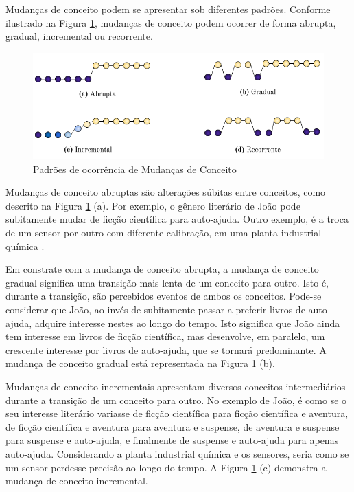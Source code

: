 \documentclass[qual, classic, a4paper]{ufbathesis}
\begin{document}
Mudanças de conceito podem se apresentar sob diferentes padrões.
Conforme ilustrado na Figura \ref{fig:concept_drift_patterns}, mudanças de conceito podem ocorrer de forma abrupta, gradual, incremental ou recorrente.
 
\begin{figure}[!ht]
\begin{center}
    \includegraphics[scale=0.80]{imagens/concept_drift_patterns.png}
    \caption{Padrões de ocorrência de Mudanças de Conceito}
    \label{fig:concept_drift_patterns}
\end{center}
\end{figure}

Mudanças de conceito abruptas são alterações súbitas entre conceitos, como descrito na Figura \ref{fig:concept_drift_patterns} (a).
Por exemplo, o gênero literário de João pode subitamente mudar de ficção científica para auto-ajuda.
Outro exemplo, é a troca de um sensor por outro com diferente calibração, em uma planta industrial química \cite{Gama:2014:SCD:2597757.2523813}. 

Em constrate com a mudança de conceito abrupta, a mudança de conceito gradual significa uma transição mais lenta de um conceito para outro.
Isto é, durante a transição, são percebidos eventos de ambos os conceitos.
Pode-se considerar que João, ao invés de subitamente passar a preferir livros de auto-ajuda, adquire interesse nestes ao longo do tempo.
Isto significa que João ainda tem interesse em livros de ficção científica, mas desenvolve, em paralelo, um crescente interesse por livros de auto-ajuda, que se tornará predominante.
A mudança de conceito gradual está representada na Figura \ref{fig:concept_drift_patterns} (b).

Mudanças de conceito incrementais apresentam diversos conceitos intermediários durante a transição de um conceito para outro.
No exemplo de João, é como se o seu interesse literário variasse de ficção científica para ficção científica e aventura, 
de ficção científica e aventura para aventura e suspense, de aventura e suspense para suspense e auto-ajuda, e finalmente de suspense e auto-ajuda para apenas auto-ajuda.
Considerando a planta industrial química e os sensores, seria como se um sensor perdesse precisão ao longo do tempo. 
A Figura \ref{fig:concept_drift_patterns} (c) demonstra a mudança de conceito incremental. 
\end{document}
